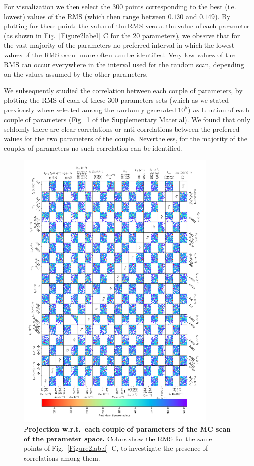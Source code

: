 \documentclass[oneside, 10pt, a4paper, twocolumn]{article}
\begin{document}
For visualization we then select the {$300$} points corresponding to the best (i.e. lowest) values of the RMS (which then range between $0.130$ and $0.149$). 
By plotting for these points the value of the RMS versus the value of each parameter (as shown in Fig.~\ref{Figure2label}~C for the 20 parameters), we observe that for the vast majority of the parameters no preferred interval in which the lowest values of the RMS occur more often can be identified. Very low values of the RMS can occur everywhere in the interval used for the random scan, depending on the values assumed by the other parameters. 

We subsequently studied the correlation between each couple of parameters, by plotting the RMS of each of these {300} parameters sets (which as we stated previously where selected among the randomly generated $10^5$) as function of each couple of parameters (Fig.~\ref{Figure5label} of the Supplementary Material). {We found that only seldomly there are clear correlations or anti-correlations} between the preferred values for the two parameters of the couple. Nevertheless, for the majority of the couples of parameters no such correlation can be identified. 


\begin{figure}
\centering
\includegraphics[width=0.88\textwidth]{Figure5_SupMat.pdf}
\caption{\small{\textbf{Projection w.r.t.~each couple of parameters of the MC scan of the parameter space.} Colors show the RMS for the same points of Fig.~\ref{Figure2label}~C, to investigate the presence of correlations among them.}
}
\label{Figure5label}
\end{figure}
\end{document}

